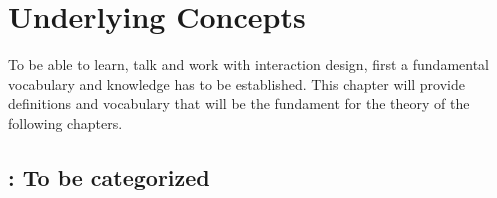 \chapter{Underlying Concepts} \label{chap:concepts}
To be able to learn, talk and work with interaction design, first a fundamental vocabulary and knowledge has to be established. This chapter will provide definitions and vocabulary that will be the fundament for the theory of the following chapters.

\vfill \minitoc \newpage




\newpage
\section{\todo : To be categorized}
